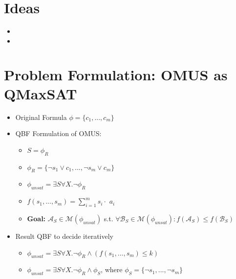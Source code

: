 \documentclass{article}
\newcommand\comment[1]{\marginpar{\tiny #1}}
\renewcommand\comment[1]{#1}
\newcommand{\emilio}[1]{{\comment{\color{red}#1}}}
\begin{document}
\section{Ideas}
\begin{itemize}
  \item
  \item
\end{itemize}


\section{Problem Formulation: OMUS as QMaxSAT}
\begin{itemize}
  \item Original Formula $\phi = \{c_1, ..., c_m\}$
  \item QBF Formulation of OMUS:
        \begin{itemize}
          \item $S = \phi_R$
          \item $\phi_R = \{\lnot s_1 \vee c_1, ..., \lnot s_m \vee c_m\}$
          \item $\phi_{unsat} = \exists S \forall X. \lnot \phi_R$
          \item $f(s_1, ..., s_m) = \sum^{m}_{i=1} s_i \cdot$ \emilio{$a_i$}
          \item \textbf{Goal:} $\mathcal{A}_S \in \mathcal{M}(\phi_{unsat})$ s.t. $\forall \mathcal{B}_S \in \mathcal{M}(\phi_{unsat}): f(\mathcal{A}_S) \leq f(\mathcal{B}_S)$
        \end{itemize}
  \item Result QBF to decide iteratively
        \begin{itemize}
          \item $\phi_{unsat} = \exists S \forall X. \lnot \phi_R \wedge ( f(s_1, ..., s_m)  \leq k)$
          \item $\phi_{unsat} = \exists S \forall X. \lnot \phi_R \wedge \phi_S$, where $\phi_S = \{\lnot s_1, ..., \lnot s_m\}$
        \end{itemize}
\end{itemize}
\end{document}
